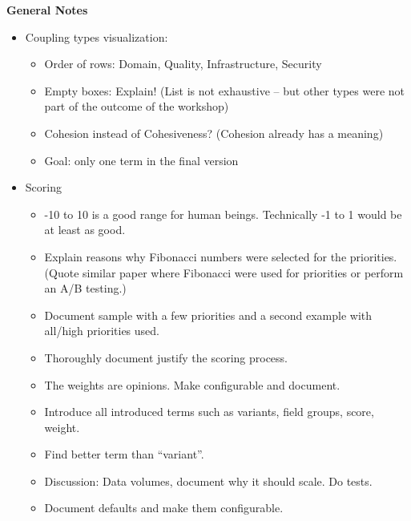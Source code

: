 \textbf{General Notes}

\begin{itemize}
\item Coupling types visualization:

	\begin{itemize}
	\item Order of rows: Domain, Quality, Infrastructure, Security
	\item Empty boxes: Explain! (List is not exhaustive – but other types were not part of the outcome of the workshop)
	\item Cohesion instead of Cohesiveness? (Cohesion already has a meaning)
	\item Goal: only one term in the final version
	\end{itemize}

\item Scoring

	\begin{itemize}
		\item -10 to 10 is a good range for human beings. Technically -1 to 1 would be at least as good.
		\item Explain reasons why Fibonacci numbers were selected for the priorities. (Quote similar paper where Fibonacci were used for priorities or perform an A/B testing.)
		\item Document sample with a few priorities and a second example with all/high priorities used.
		\item Thoroughly document justify the scoring process.
		\item The weights are opinions. Make configurable and document. 
		\item Introduce all introduced terms such as variants, field groups, score, weight.
		\item Find better term than “variant”.
		\item Discussion: Data volumes, document why it should scale. Do tests.
		\item Document defaults and make them configurable.
	\end{itemize}


\end{itemize}
